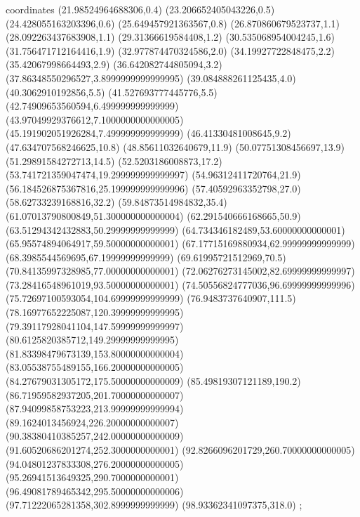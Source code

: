 coordinates {%
(21.98524964688306,0.4)
(23.206652405043226,0.5)
(24.428055163203396,0.6)
(25.649457921363567,0.8)
(26.870860679523737,1.1)
(28.092263437683908,1.1)
(29.31366619584408,1.2)
(30.535068954004245,1.6)
(31.756471712164416,1.9)
(32.977874470324586,2.0)
(34.19927722848475,2.2)
(35.42067998664493,2.9)
(36.642082744805094,3.2)
(37.86348550296527,3.8999999999999995)
(39.084888261125435,4.0)
(40.3062910192856,5.5)
(41.527693777445776,5.5)
(42.74909653560594,6.499999999999999)
(43.97049929376612,7.1000000000000005)
(45.191902051926284,7.499999999999999)
(46.41330481008645,9.2)
(47.634707568246625,10.8)
(48.85611032640679,11.9)
(50.07751308456697,13.9)
(51.29891584272713,14.5)
(52.5203186008873,17.2)
(53.741721359047474,19.299999999999997)
(54.96312411720764,21.9)
(56.184526875367816,25.199999999999996)
(57.40592963352798,27.0)
(58.62733239168816,32.2)
(59.84873514984832,35.4)
(61.07013790800849,51.300000000000004)
(62.291540666168665,50.9)
(63.51294342432883,50.29999999999999)
(64.734346182489,53.60000000000001)
(65.95574894064917,59.50000000000001)
(67.17715169880934,62.99999999999999)
(68.3985544569695,67.19999999999999)
(69.61995721512969,70.5)
(70.84135997328985,77.00000000000001)
(72.06276273145002,82.69999999999997)
(73.28416548961019,93.50000000000001)
(74.50556824777036,96.69999999999996)
(75.72697100593054,104.69999999999999)
(76.9483737640907,111.5)
(78.16977652225087,120.39999999999995)
(79.39117928041104,147.59999999999997)
(80.6125820385712,149.29999999999995)
(81.83398479673139,153.80000000000004)
(83.05538755489155,166.20000000000005)
(84.27679031305172,175.50000000000009)
(85.49819307121189,190.2)
(86.71959582937205,201.70000000000007)
(87.94099858753223,213.99999999999994)
(89.1624013456924,226.20000000000007)
(90.38380410385257,242.00000000000009)
(91.60520686201274,252.3000000000001)
(92.8266096201729,260.70000000000005)
(94.04801237833308,276.20000000000005)
(95.26941513649325,290.7000000000001)
(96.49081789465342,295.50000000000006)
(97.71222065281358,302.8999999999999)
(98.93362341097375,318.0)
};
